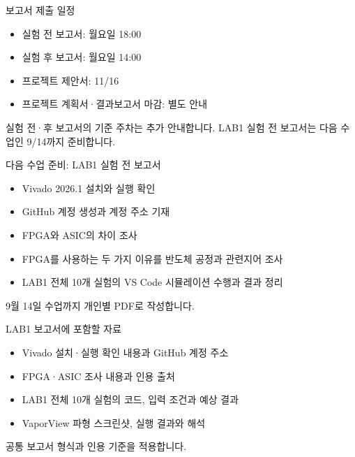 \documentclass[aspectratio=169,11pt,t]{beamer}
\begin{document}
\begin{frame}{보고서 제출 일정}
\begin{itemize}
\item 실험 전 보고서: 월요일 18:00
\item 실험 후 보고서: 월요일 14:00
\item 프로젝트 제안서: 11/16
\item 프로젝트 계획서·결과보고서 마감: 별도 안내
\end{itemize}
\vspace{0.35cm}
실험 전·후 보고서의 기준 주차는 추가 안내합니다. LAB1 실험 전 보고서는 다음 수업인 9/14까지 준비합니다.
\end{frame}

\begin{frame}{다음 수업 준비: LAB1 실험 전 보고서}
\begin{itemize}
\item Vivado 2026.1 설치와 실행 확인
\item GitHub 계정 생성과 계정 주소 기재
\item FPGA와 ASIC의 차이 조사
\item FPGA를 사용하는 두 가지 이유를 반도체 공정과 관련지어 조사
\item LAB1 전체 10개 실험의 VS Code 시뮬레이션 수행과 결과 정리
\end{itemize}
\vspace{0.35cm}
9월 14일 수업까지 개인별 PDF로 작성합니다.
\end{frame}

\begin{frame}{LAB1 보고서에 포함할 자료}
\begin{itemize}
\item Vivado 설치·실행 확인 내용과 GitHub 계정 주소
\item FPGA·ASIC 조사 내용과 인용 출처
\item LAB1 전체 10개 실험의 코드, 입력 조건과 예상 결과
\item VaporView 파형 스크린샷, 실행 결과와 해석
\end{itemize}
\vspace{0.35cm}
공통 보고서 형식과 인용 기준을 적용합니다.
\end{frame}
\end{document}
